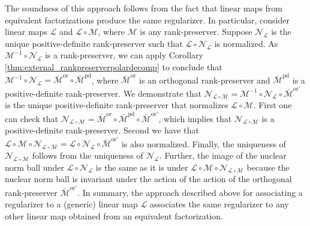 \documentclass[11pt,letterpaper]{article}
\renewcommand{\L}{\mathcal{L}}
\begin{document}
The soundness of this approach follows from the fact that linear maps from equivalent factorizations produce the same regularizer.  In particular, consider linear maps $\L$ and $\L \circ \mathcal{M}$, where $\mathcal{M}$ is any rank-preserver.  Suppose $\mathcal{N}_\L$ is the unique positive-definite rank-preserver such that $\L \circ \mathcal{N}_\L$ is normalized.  As $\mathcal{M}^{-1} \circ \mathcal{N}_{\mathcal{L}}$ is a rank-preserver, we can apply Corollary \ref{thm:external_rankpreserverpolardecomp} to conclude that $\mathcal{M}^{-1} \circ \mathcal{N}_{\mathcal{L}} = \bar{\mathcal{M}}^{\mathrm{or}} \circ \bar{\mathcal{M}}^{\mathrm{pd}}$, where $\bar{\mathcal{M}}^{\mathrm{or}}$ is an orthogonal rank-preserver and $\bar{\mathcal{M}}^{\mathrm{pd}}$ is a positive-definite rank-preserver.  We demonstrate that $\mathcal{N}_{\L \circ \mathcal{M}} = \mathcal{M}^{-1} \circ \mathcal{N}_{\L} \circ \bar{\mathcal{M}}^{\mathrm{or}'}$ is the unique positive-definite rank-preserver that normalizes $\L \circ \mathcal{M}$.  First one can check that $\mathcal{N}_{\L \circ \mathcal{M}} = \bar{\mathcal{M}}^{\mathrm{or}} \circ \bar{\mathcal{M}}^{\mathrm{pd}} \circ \bar{\mathcal{M}}^{\mathrm{or}'}$, which implies that $\mathcal{N}_{\L \circ \mathcal{M}}$ is a positive-definite rank-preserver.  Second we have that $\L \circ \mathcal{M} \circ \mathcal{N}_{\L \circ \mathcal{M}} = \L \circ \mathcal{N}_{\L} \circ \bar{\mathcal{M}}^{\mathrm{or}'}$ is also normalized.  Finally, the uniqueness of $\mathcal{N}_{\L \circ \mathcal{M}}$ follows from the uniqueness of $\mathcal{N}_\L$. Further, the image of the nuclear norm ball under $\L \circ \mathcal{N}_\L$ is the same as it is under $\L \circ \mathcal{M} \circ \mathcal{N}_{\L \circ \mathcal{M}}$ because the nuclear norm ball is invariant under the action of the action of the orthogonal rank-preserver $\bar{\mathcal{M}}^{\mathrm{or}'}$.  In summary, the approach described above for associating a regularizer to a (generic) linear map $\L$ associates the same regularizer to any other linear map obtained from an equivalent factorization.
\end{document}
